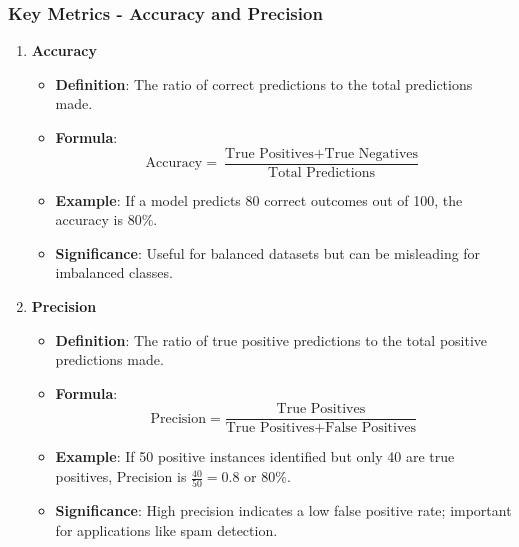 \documentclass[aspectratio=169]{beamer}
\begin{document}
\begin{frame}[fragile]
    \frametitle{Key Metrics - Accuracy and Precision}
    \begin{enumerate}
        \item \textbf{Accuracy}
        \begin{itemize}
            \item \textbf{Definition}: The ratio of correct predictions to the total predictions made.
            \item \textbf{Formula}:
            \[
            \text{Accuracy} = \frac{\text{True Positives} + \text{True Negatives}}{\text{Total Predictions}}
            \]
            \item \textbf{Example}: If a model predicts 80 correct outcomes out of 100, the accuracy is \(80\%\).
            \item \textbf{Significance}: Useful for balanced datasets but can be misleading for imbalanced classes.
        \end{itemize}
        
        \item \textbf{Precision}
        \begin{itemize}
            \item \textbf{Definition}: The ratio of true positive predictions to the total positive predictions made.
            \item \textbf{Formula}:
            \[
            \text{Precision} = \frac{\text{True Positives}}{\text{True Positives} + \text{False Positives}}
            \]
            \item \textbf{Example}: If 50 positive instances identified but only 40 are true positives, Precision is \( \frac{40}{50} = 0.8\) or \(80\%\).
            \item \textbf{Significance}: High precision indicates a low false positive rate; important for applications like spam detection.
        \end{itemize}
    \end{enumerate}
\end{frame}
\end{document}
